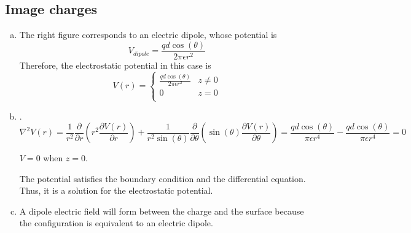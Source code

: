 \documentclass{article} %
\begin{document}
\subsection*{Image charges}
\begin{enumerate}[(a)]
      \item The right figure corresponds to an electric dipole, whose potential is
            \[V_{dipole} = \frac{qd \cos(\theta)}{2 \pi \epsilon r^2}\]
            Therefore, the electrostatic potential in this case is
            \[
                  V(r) =
                  \begin{cases}
                        \frac{qd \cos(\theta)}{2 \pi \epsilon r^2} & z \neq 0 \\
                        0                                          & z = 0    \\
                  \end{cases}
            \]
      \item {}.
            \[\nabla^2 V(r) = \frac{1}{r^2} \frac{\partial}{\partial r} \left(r^2 \frac{\partial V(r)}{\partial r}\right) + \frac{1}{r^2 \sin(\theta)} \frac{\partial}{\partial \theta}\left(\sin(\theta)\frac{\partial V(r)}{\partial \theta}\right) = \frac{qd\cos(\theta)}{\pi \epsilon r^4} - \frac{qd\cos(\theta)}{\pi \epsilon r^4} = 0\]

            $V = 0$ when $z = 0$.

            The potential satisfies the boundary condition and the differential equation. Thus, it is a solution for the electrostatic potential.
      \item A dipole electric field will form between the charge and the surface because the configuration is equivalent to an electric dipole.
\end{enumerate}
\end{document}

